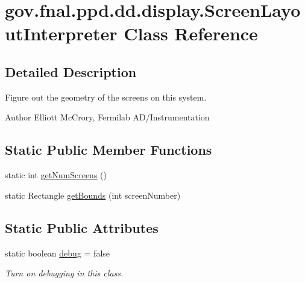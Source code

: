 \hypertarget{classgov_1_1fnal_1_1ppd_1_1dd_1_1display_1_1ScreenLayoutInterpreter}{\section{gov.\-fnal.\-ppd.\-dd.\-display.\-Screen\-Layout\-Interpreter Class Reference}
\label{classgov_1_1fnal_1_1ppd_1_1dd_1_1display_1_1ScreenLayoutInterpreter}
}


\subsection{Detailed Description}
Figure out the geometry of the screens on this system.

\begin{DoxyAuthor}{Author}
Elliott Mc\-Crory, Fermilab A\-D/\-Instrumentation 
\end{DoxyAuthor}
\subsection*{Static Public Member Functions}
\begin{DoxyCompactItemize}
\item 
static int \hyperlink{classgov_1_1fnal_1_1ppd_1_1dd_1_1display_1_1ScreenLayoutInterpreter_a28bf32f519c6365ebf15a0d8d539595f}{get\-Num\-Screens} ()
\item 
static Rectangle \hyperlink{classgov_1_1fnal_1_1ppd_1_1dd_1_1display_1_1ScreenLayoutInterpreter_a1202af9585c07cffdc214d0674d30e35}{get\-Bounds} (int screen\-Number)
\end{DoxyCompactItemize}
\subsection*{Static Public Attributes}
\begin{DoxyCompactItemize}
\item 
\hypertarget{classgov_1_1fnal_1_1ppd_1_1dd_1_1display_1_1ScreenLayoutInterpreter_aa00d08475435546dab252b31c72e982d}{static boolean \hyperlink{classgov_1_1fnal_1_1ppd_1_1dd_1_1display_1_1ScreenLayoutInterpreter_aa00d08475435546dab252b31c72e982d}{debug} = false}\label{classgov_1_1fnal_1_1ppd_1_1dd_1_1display_1_1ScreenLayoutInterpreter_aa00d08475435546dab252b31c72e982d}

\begin{DoxyCompactList}\small\item\em Turn on debugging in this class. \end{DoxyCompactList}\end{DoxyCompactItemize}


